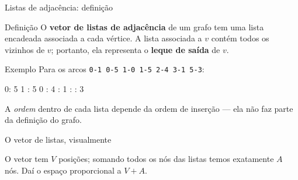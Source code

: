 \documentclass[aspectratio=169]{beamer}
\begin{document}
\begin{frame}{Listas de adjacência: definição}
  \begin{block}{Definição}
    {\small O \textbf{vetor de listas de adjacência} de um grafo tem uma lista
    encadeada associada a cada vértice. A lista associada a $v$ contém todos os
    vizinhos de $v$; portanto, ela representa o \textbf{leque de saída} de $v$.}
  \end{block}
  \begin{exampleblock}{Exemplo}
    {\small Para os arcos \texttt{0-1 0-5 1-0 1-5 2-4 3-1 5-3}:}
    \begin{center}\ttfamily\scriptsize
      0: 5 1 \quad{}: 5 0 \quad{}: 4 \quad{}: 1 \quad{}: \quad{}: 3
    \end{center}
    {\scriptsize A \emph{ordem} dentro de cada lista depende da ordem de
    inserção --- ela não faz parte da definição do grafo.}
  \end{exampleblock}
\end{frame}

\begin{frame}{O vetor de listas, visualmente}
  \begin{center}
  \end{center}
  {\scriptsize O vetor tem $V$ posições; somando todos os nós das listas temos
  exatamente $A$ nós. Daí o espaço proporcional a $V+A$.}
\end{frame}
\end{document}
